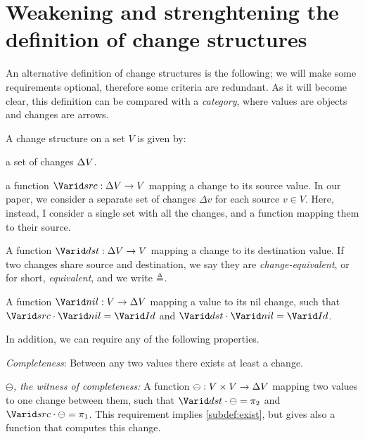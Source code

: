 \section{Weakening and strenghtening the definition of change structures}
An alternative definition of change structures is the following; we will make
some requirements optional, therefore some criteria are redundant. As it will
become clear, this definition can be compared with a \emph{category}, where
values are objects and changes are arrows.
\begin{definition}
A change structure on a set $V$ is given by:
\begin{subdefinition}
\item a set of changes $\Delta V$.
\item\label{subdef:src} a function $\Term{src} : \GD V \to V$ mapping a change to
  its source value. In our paper, we consider a separate set of changes
  $\Delta v$ for each source $v \in V$. Here, instead, I consider a single set
  with all the changes, and a function mapping them to their source.
\item\label{subdef:dst} A function $\Term{dst} : \GD V \to V$ mapping a change to
  its destination value. If two changes share source and destination, we say
  they are \emph{change-equivalent}, or for short,
  \emph{equivalent}, and we write $\Doe$.
\item\label{subdef:nil} A function $\Term{nil} : V \to \GD V$ mapping a value to
  its nil change, such that $\Term{src} \cdot \Term{nil} = \Term{Id}$ and
  $\Term{dst} \cdot \Term{nil} = \Term{Id}$.
\end{subdefinition}
In addition, we can require any of the following properties.
\begin{subdefinition}[resume]
\item\label{subdef:exist} \emph{Completeness}: Between any two values there exists
  at least a change.
\item\label{subdef:ominus} \emph{$\ominus$, the witness of completeness:} A
  function $\ominus : V \times V \to \Delta V$ mapping two values to one change
  between them, such that $\Term{dst} \cdot \ominus = \pi_2$ and
  $\Term{src} \cdot \ominus = \pi_1$. This requirement implies
  \cref{subdef:exist}, but gives also a function that computes this change.


\end{subdefinition}
\end{definition}
